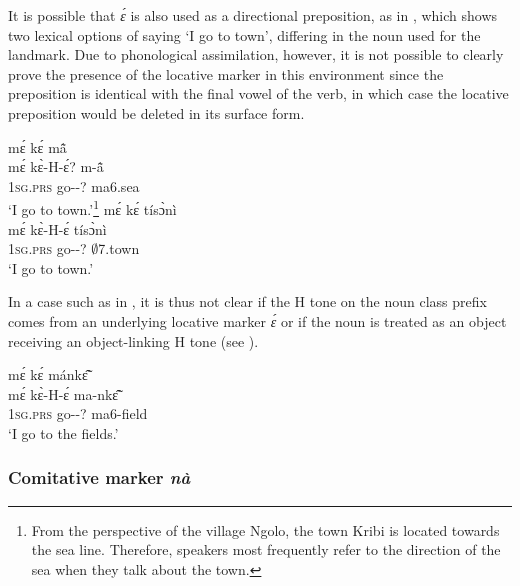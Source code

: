 It is possible that {\itshape ɛ́} is also used as a directional preposition, as in , which shows two lexical options of saying `I go to town', differing in the noun used for the landmark. Due to phonological assimilation, however, it is not possible to clearly prove the presence of the locative marker in this environment since the preposition is identical with the final vowel of the verb, in which case the locative preposition would be deleted in its surface form.

\ea \label{totown}
  \ea \label{totown1}
  \glll    mɛ́ kɛ́ mã̂\\
          mɛ́ kɛ̀-H-ɛ́? m-ã̂\\
              1\textsc{sg}.\textsc{prs} go-{\R}-{\LOC}? ma6.sea \\
    \trans `I go to town.'\footnote{From the perspective of the village Ngolo, the town Kribi is located towards the sea line. Therefore, speakers most frequently refer to the direction of the sea when they talk about the town.}
\ex\label{totown2}
  \glll    mɛ́ kɛ́ tísɔ̀nì\\
         mɛ́ kɛ̀-H-ɛ́ tísɔ̀nì\\
              1\textsc{sg}.\textsc{prs} go-{\R}-{\LOC}? $\emptyset$7.town \\
    \trans `I go to town.'
\z
\z

In a case such as in , it is thus not clear if the H tone on the noun class prefix comes from an underlying locative marker {\itshape ɛ́} or if the noun is treated as an object receiving an object-linking H tone (see ).

\ea \label{efields}
  \glll    mɛ́ kɛ́ mánkɛ̃̂\\
         mɛ́ kɛ̀-H-ɛ́ ma-nkɛ̃̂\\
              1\textsc{sg}.\textsc{prs} go-{\R}-{\LOC}? ma6-field \\
    \trans `I go to the fields.'
\z





\subsubsection{Comitative marker {\itshape nà}}
\label{sec:COM}

